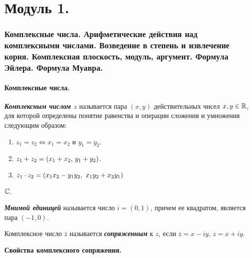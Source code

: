  \part{Модуль 1.}

\section{
    Комплексные числа. Арифметические действия над комплексными числами. Возведение в степень и извлечение корня. Комплексная плоскость, модуль, аргумент. Формула Эйлера. Формула Муавра.
}

\subsection{
    Комплексные числа.
}

\begin{definition}
    \textbf{\textit{Комплексным числом $z$}} называется пара $(x, y)$ действительных чисел $x, y \in \mathbb{R}$, для которой определены понятие равенства и операции сложения и умножения следующим образом:
    
    \begin{enumerate}[nosep]
        \item $z_1 = z_2 \iff x_1 = x_2$ и $y_1 = y_2$.
        \item $z_1 + z_2 = (x_1 + x_2, \thinspace y_1 + y_2)$.
        \item $z_1 \cdot z_2 = (x_1x_2 - y_1y_2, \thinspace \thinspace x_1y_2 + x_2y_1)$
    \end{enumerate}
\end{definition}

\begin{designation}
    $\mathbb{C}$.
\end{designation}

\begin{definition}
    \textbf{\textit{Мнимой единицей}} называется число $i = (0, 1)$, причем ее квадратом, является пара $(-1, 0)$.
\end{definition}

\begin{definition}
    Комплексное число $\overline{z}$ называется \textbf{\textit{сопряженным}} к $z$, если $\overline{z} = x - iy$, $z = x + iy$.
\end{definition}

\textbf{Свойства комплексного сопряжения.}

